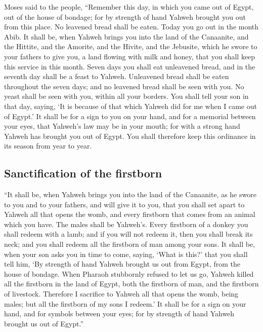  Moses said to the people, ``Remember this day, in which
you came out of Egypt, out of the house of bondage; for by strength of
hand Yahweh brought you out from this place. No leavened bread shall be
eaten.  Today you go out in the month Abib. 
It shall be, when Yahweh brings you into the land of the Canaanite, and
the Hittite, and the Amorite, and the Hivite, and the Jebusite, which he
swore to your fathers to give you, a land flowing with milk and honey,
that you shall keep this service in this month.  Seven
days you shall eat unleavened bread, and in the seventh day shall be a
feast to Yahweh.  Unleavened bread shall be eaten
throughout the seven days; and no leavened bread shall be seen with you.
No yeast shall be seen with you, within all your borders. 
You shall tell your son in that day, saying, `It is because of that
which Yahweh did for me when I came out of Egypt.'  It
shall be for a sign to you on your hand, and for a memorial between your
eyes, that Yahweh's law may be in your mouth; for with a strong hand
Yahweh has brought you out of Egypt.  You shall therefore
keep this ordinance in its season from year to year.

\hypertarget{sanctification-of-the-firstborn}{%
\subsection{Sanctification of the
firstborn}\label{sanctification-of-the-firstborn}}

 ``It shall be, when Yahweh brings you into the land of
the Canaanite, as he swore to you and to your fathers, and will give it
to you,  that you shall set apart to Yahweh all that
opens the womb, and every firstborn that comes from an animal which you
have. The males shall be Yahweh's.  Every firstborn of a
donkey you shall redeem with a lamb; and if you will not redeem it, then
you shall break its neck; and you shall redeem all the firstborn of man
among your sons.  It shall be, when your son asks you in
time to come, saying, `What is this?' that you shall tell him, `By
strength of hand Yahweh brought us out from Egypt, from the house of
bondage.  When Pharaoh stubbornly refused to let us go,
Yahweh killed all the firstborn in the land of Egypt, both the firstborn
of man, and the firstborn of livestock. Therefore I sacrifice to Yahweh
all that opens the womb, being males; but all the firstborn of my sons I
redeem.'  It shall be for a sign on your hand, and for
symbols between your eyes; for by strength of hand Yahweh brought us out
of Egypt.''

